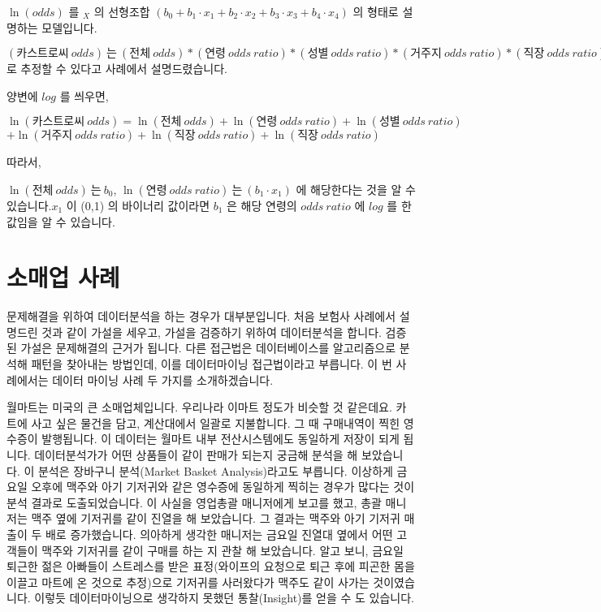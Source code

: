\documentclass[letterpaper,10pt,english]{jupyterBook}
\begin{document}
\sphinxAtStartPar
\( \ln(odds) \) 를 \( _X \) 의 선형조합 \( (b_0 + b_1 \cdot x_1 + b_2 \cdot x_2 + b_3 \cdot x_3 + b_4  \cdot x_4) \)  의 형태로 설명하는 모델입니다.

\sphinxAtStartPar
\( (카스트로씨 \ odds) \ 는 \ (전체 \ odds) * (연령\ odds\ ratio) * (성별\ odds\ ratio) * (거주지\ odds\ ratio) * (직장\ odds\ ratio) \)로 추정할 수 있다고 사례에서 설명드렸습니다.

\sphinxAtStartPar
양변에 \(log\) 를 씌우면,

\sphinxAtStartPar
\( \ln(카스트로씨\ odds) = \ln(전체\ odds)  + \ln(연령\ odds\ ratio) + \ln(성별\ odds\ ratio)\)\( + \ln(거주지\ odds\ ratio) + \ln(직장\ odds\ ratio) + \ln(직장\ odds\ ratio) \)

\sphinxAtStartPar
따라서,

\sphinxAtStartPar
\( \ln(전체\ odds)\ 는 \ b_0 \),  \( \ln(연령\ odds\ ratio)\ 는\ (b_1 \cdot x_1) \) 에 해당한다는 것을 알 수 있습니다.\( x_1 \) 이 (0,1) 의 바이너리 값이라면 \( b_1 \) 은 해당 연령의 \( odds\ ratio \) 에 \( log \) 를 한 값임을 알 수 있습니다.




\part{소매업 사례}
\label{\detokenize{chapter3/3.1.3_Use_Case:id1}}\label{\detokenize{chapter3/3.1.3_Use_Case::doc}}
\sphinxAtStartPar
문제해결을 위하여 데이터분석을 하는 경우가 대부분입니다.  처음 보험사 사례에서 설명드린 것과 같이 가설을 세우고, 가설을 검증하기 위하여 데이터분석을 합니다. 검증된 가설은 문제해결의 근거가 됩니다. 다른 접근법은 데이터베이스를 알고리즘으로 분석해 패턴을 찾아내는 방법인데, 이를 데이터마이닝 접근법이라고 부릅니다. 이 번 사례에서는 데이터 마이닝 사례 두 가지를 소개하겠습니다.

\sphinxAtStartPar
월마트는 미국의 큰 소매업체입니다. 우리나라 이마트 정도가 비슷할 것 같은데요. 카트에 사고 싶은 물건을 담고, 계산대에서 일괄로 지불합니다. 그 때 구매내역이 찍힌 영수증이 발행됩니다. 이 데이터는 월마트 내부 전산시스템에도 동일하게 저장이 되게 됩니다. 데이터분석가가 어떤 상품들이 같이 판매가 되는지 궁금해 분석을 해 보았습니다. 이 분석은 장바구니 분석(Market Basket Analysis)라고도 부릅니다. 이상하게 금요일 오후에 맥주와 아기 기저귀와 같은 영수증에 동일하게 찍히는 경우가 많다는 것이 분석 결과로 도출되었습니다. 이 사실을 영업총괄 매니저에게 보고를 했고, 총괄 매니저는 맥주 옆에 기저귀를 같이 진열을 해 보았습니다. 그 결과는 맥주와 아기 기저귀 매출이 두 배로 증가했습니다. 의아하게 생각한 매니저는 금요일 진열대 옆에서 어떤 고객들이 맥주와 기저귀를 같이 구매를 하는 지 관찰 해 보았습니다. 알고 보니, 금요일 퇴근한 젊은 아빠들이 스트레스를 받은 표정(와이프의 요청으로 퇴근 후에 피곤한 몸을 이끌고 마트에 온 것으로 추정)으로 기저귀를 사러왔다가 맥주도 같이 사가는 것이였습니다. 이렇듯 데이터마이닝으로 생각하지 못했던 통찰(Insight)를 얻을 수 도 있습니다.
\end{document}
